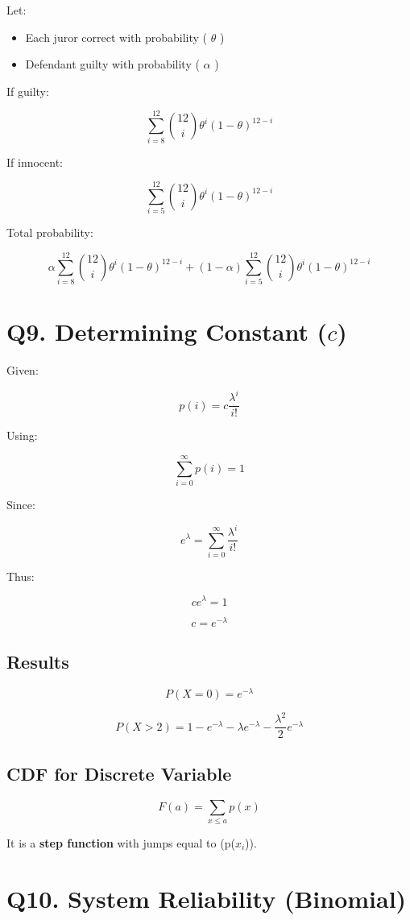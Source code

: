 \documentclass[12pt]{article}
\begin{document}
Let:

\begin{itemize}
    \item Each juror correct with probability ( $\theta$ )
    \item Defendant guilty with probability ( $\alpha$ )
\end{itemize}

If guilty:

\[
\sum_{i=8}^{12}\binom{12}{i}\theta^i(1-\theta)^{12-i}
\]

If innocent:

\[
\sum_{i=5}^{12}\binom{12}{i}\theta^i(1-\theta)^{12-i}
\]

Total probability:

\[
\alpha \sum_{i=8}^{12} \binom{12}{i}\theta^i(1-\theta)^{12-i}
+
(1-\alpha)\sum_{i=5}^{12} \binom{12}{i}\theta^i(1-\theta)^{12-i}
\]

\section*{Q9. Determining Constant ($c$)}

Given:

\[
p(i)=c\frac{\lambda^i}{i!}
\]

Using:

\[
\sum_{i=0}^{\infty}p(i)=1
\]

Since:

\[
e^\lambda=\sum_{i=0}^{\infty}\frac{\lambda^i}{i!}
\]

Thus:

\[
ce^\lambda=1
\]

\[
c=e^{-\lambda}
\]

\subsection*{Results}

\[
P(X=0)=e^{-\lambda}
\]

\[
P(X>2)=1-e^{-\lambda}-\lambda e^{-\lambda}-\frac{\lambda^2}{2}e^{-\lambda}
\]

\subsection*{CDF for Discrete Variable}

\[
F(a)=\sum_{x\le a}p(x)
\]

It is a \textbf{step function} with jumps equal to (p($x_i$)).

\section*{Q10. System Reliability (Binomial)}
\end{document}
